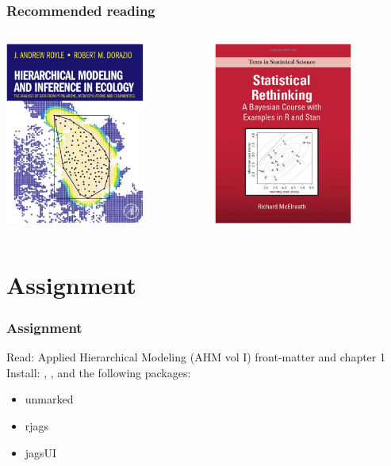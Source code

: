 \documentclass[color=usenames,dvipsnames]{beamer}\usepackage[]{graphicx}\usepackage[]{color}
\begin{document}
\begin{frame}
\begin{columns}
\begin{column}{0.33\textwidth}
    \end{column} 
  \end{columns} 
\end{frame}


\begin{frame}
  \frametitle{Recommended reading}
  \begin{columns}[c]
    \setlength\fboxsep{0pt}
    \begin{column}{0.5\textwidth}
      \centering
      \includegraphics[height=6cm]{figs/RoyleDorazioBookCover} \\
    \end{column}
    \hfill
    \begin{column}{0.5\textwidth}
      \centering
      \includegraphics[height=6cm]{figs/McElreathBookCover} \\
    \end{column}
  \end{columns}
\end{frame}



\section{Assignment}


\begin{frame}
  \frametitle{Assignment}
  \large
  Read: Applied Hierarchical Modeling (AHM vol I) front-matter and chapter 1 \\
  \vfill
  Install: \href{https://sourceforge.net/projects/mcmc-jags/files/}{\jags},
  \href{https://www.r-project.org/}{\R}, and the following packages:
  \begin{itemize}
    \tt
    \item unmarked
    \item rjags
    \item jagsUI
  \end{itemize}
\end{frame}
\end{document}
